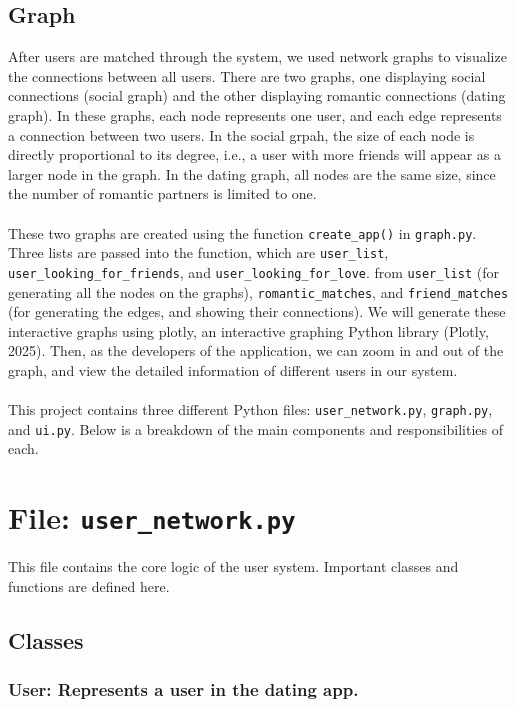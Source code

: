 \documentclass[fontsize=11pt]{article}
\begin{document}
\subsection*{Graph}
After users are matched through the system, we used network graphs to visualize the connections between all users.
There are two graphs, one displaying social connections (social graph) and the other displaying romantic connections (dating graph).
In these graphs, each node represents one user, and each edge represents a connection between two users.
In the social grpah, the size of each node is directly proportional to its degree, i.e., a user with more friends will appear as a larger node in the graph.
In the dating graph, all nodes are the same size, since the number of romantic partners is limited to one.
\\
\\
These two graphs are created using the function \texttt{create\_app()} in \texttt{graph.py}.
Three lists are passed into the function, which are \texttt{user\_list}, \texttt{user\_looking\_for\_friends}, and \texttt{user\_looking\_for\_love}.
from \texttt{user\_list} (for generating all the nodes on the graphs),
\texttt{romantic\_matches}, and \texttt{friend\_matches} (for generating the edges, and showing their connections).
We will generate these interactive graphs using plotly, an interactive graphing Python library (Plotly, 2025).
Then, as the developers of the application, we can zoom in and out of the graph, and view the detailed information of different users in our system.
\\
\\
This project contains three different Python files: \texttt{user\_network.py}, \texttt{graph.py}, and \texttt{ui.py}. Below is a breakdown of the main components and responsibilities of each.

\section*{File: \texttt{user\_network.py}}

This file contains the core logic of the user system. Important classes and functions are defined here.

\subsection*{Classes}

\subsubsection*{User: Represents a user in the dating app.}
\end{document}
